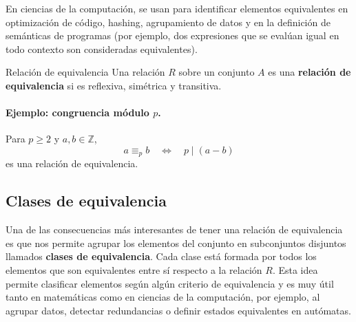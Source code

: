 En ciencias de la computación, se usan para identificar elementos equivalentes en optimización de código, hashing, agrupamiento de datos y en la definición de semánticas de programas (por ejemplo, dos expresiones que se evalúan igual en todo contexto son consideradas equivalentes).


\begin{definitionblock}{Relación de equivalencia}
Una relación $R$ sobre un conjunto $A$ es una \textbf{relación de equivalencia} si es reflexiva, simétrica y transitiva.
\end{definitionblock}

\paragraph{Ejemplo: congruencia módulo $p$.} Para $p \geq 2$ y $a,b \in \mathbb{Z}$,
\[
a \equiv_p b \quad \Leftrightarrow \quad p \mid (a - b)
\]
es una relación de equivalencia.





\bigskip
\begin{table}[h]
\centering
{}
\caption{Relación entre propiedades y tipos de relaciones comunes}
\end{table}

\subsection{Clases de equivalencia}
Una de las consecuencias más interesantes de tener una relación de equivalencia es que nos permite agrupar los elementos del conjunto en subconjuntos disjuntos llamados \textbf{clases de equivalencia}. Cada clase está formada por todos los elementos que son equivalentes entre sí respecto a la relación $R$. Esta idea permite clasificar elementos según algún criterio de equivalencia y es muy útil tanto en matemáticas como en ciencias de la computación, por ejemplo, al agrupar datos, detectar redundancias o definir estados equivalentes en autómatas.


